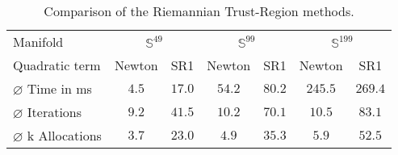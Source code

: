\begin{table}[H]
    \centering
        \begin{tabular}{lcccccc}
            \toprule
            Manifold & \multicolumn{2}{c}{$\mathbb{S}^{49}$}& \multicolumn{2}{c}{$\mathbb{S}^{99}$} & \multicolumn{2}{c}{$\mathbb{S}^{199}$}\\ 
            \cmidrule(lr){2-3} \cmidrule(lr){4-5} \cmidrule(lr){6-7}
            Quadratic term & Newton & SR1 & Newton & SR1 & Newton & SR1 \\ 

            $\varnothing$ Time in ms & $4.5$ & $17.0$ & $54.2$ & $80.2$ & $245.5$ & $269.4$\\ 
            $\varnothing$ Iterations & $9.2$ & $41.5$ & $10.2$ & $70.1$ & $10.5$ & $83.1$ \\
            $\varnothing$ k Allocations& $3.7$ & $23.0$ & $4.9$ & $35.3$ & $5.9$ & $52.5$ \\
            \bottomrule
        \end{tabular}
    \caption{Comparison of the Riemannian Trust-Region methods.} \label{tab:Results}
\end{table}

